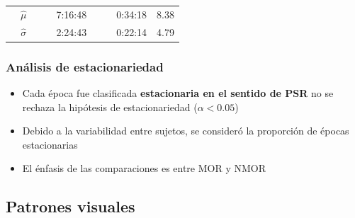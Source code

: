 \documentclass[serif,mathserif,professionalfont]{beamer}
\newcommand{\ppu}{\phantom{1}}
\begin{document}
\begin{frame}
\begin{table}
\begin{tiny}
\begin{tabular}{llcllcllr}
\rowcolor{gris}
&\multicolumn{1}{c}{$\widehat{\mu}$}  
              & &        & \ppu 7:16:48   &&        &   0:34:18 &8.38 \\
\rowcolor{gris}
&\multicolumn{1}{c}{$\widehat{\sigma}$} 
              & &        & \ppu 2:24:43   &&        &   0:22:14 &4.79 \\
\bottomrule
\end{tabular}
\end{tiny}
\end{table}
\end{frame}

\begin{frame}\frametitle{Análisis de estacionariedad}
\begin{itemize}
\item Cada \'epoca fue clasificada \textbf{estacionaria en el sentido de PSR} 
no se rechaza la hip\'otesis de 
estacionariedad ($\alpha < 0.05$)

\item Debido a la variabilidad entre sujetos, se consider\'o la proporci\'on de \'epocas 
estacionarias

\item El énfasis de las comparaciones es entre MOR y NMOR

\end{itemize}
\end{frame}


\subsection{Patrones visuales}
\end{document}

